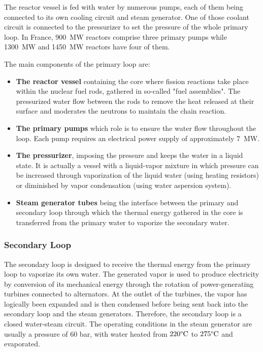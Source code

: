 \npar

The reactor vessel is fed with water by numerous pumps, each of them being connected to its own cooling circuit and steam generator. One of those coolant circuit is connected to the pressurizer to set the pressure of the whole primary loop. In France, 900~MW reactors comprise three primary pumps while 1300~MW and 1450~MW reactors have four of them.

\npar

The main components of the primary loop are:

\begin{itemize}
\item \textbf{The reactor vessel} containing the core where fission reactions take place within the nuclear fuel rods, gathered in so-called "fuel assemblies". The pressurized water flow between the rods to remove the heat released at their surface and moderates the neutrons to maintain the chain reaction.

\item \textbf{The primary pumps} which role is to ensure the water flow throughout the loop. Each pump requires an electrical power supply of approximately 7~MW.

\item \textbf{The pressurizer}, imposing the pressure and keeps the water in a liquid state. It is actually a vessel with a liquid-vapor mixture in which pressure can be increased through vaporization of the liquid water (using heating resistors) or diminished by vapor condensation (using water aspersion system).

\item \textbf{Steam generator tubes} being the interface between the primary and secondary loop through which the thermal energy gathered in the core is transferred from the primary water to vaporize the secondary water.
\end{itemize}


\subsubsection{Secondary Loop}

The secondary loop is designed to receive the thermal energy from the primary loop to vaporize its own water. The generated vapor is used to produce electricity by conversion of its mechanical energy through the rotation of power-generating turbines connected to alternators. At the outlet of the turbines, the vapor has logically been expanded and is then condensed before being sent back into the secondary loop and the steam generators. Therefore, the secondary loop is a closed water-steam circuit. The operating conditions in the steam generator are usually a pressure of 60 bar, with water heated from $220\degree\mathrm{C}$ to $275\degree\mathrm{C}$ and evaporated.

